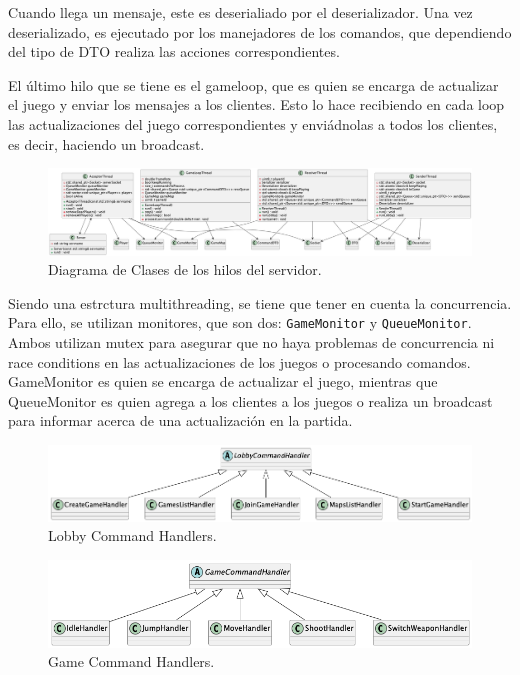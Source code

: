\documentclass[titlepage,a4paper]{article}
\begin{document}
Cuando llega un mensaje, este es deserialiado por el deserializador. Una vez deserializado, es ejecutado por los manejadores de los comandos, que dependiendo del tipo de DTO realiza las acciones correspondientes. 

El último hilo que se tiene es el gameloop, que es quien se encarga de actualizar el juego y enviar los mensajes a los clientes. Esto lo hace recibiendo en cada loop las actualizaciones del juego correspondientes y enviádnolas a todos los clientes, es decir, haciendo un broadcast.

\begin{figure}[H]
  \centering
  \includegraphics[width=\textwidth]{images/Server Threads Classes.png}
  \caption{Diagrama de Clases de los hilos del servidor.}
  \label{fig:server-threads}
\end{figure}

Siendo una estrctura multithreading, se tiene que tener en cuenta la concurrencia. Para ello, se utilizan monitores, que son dos: \texttt{GameMonitor} y \texttt{QueueMonitor}. Ambos utilizan mutex para asegurar que no haya problemas de concurrencia ni race conditions en las actualizaciones de los juegos o procesando comandos. GameMonitor es quien se encarga de actualizar el juego, mientras que QueueMonitor es quien agrega a los clientes a los juegos o realiza un broadcast para informar acerca de una actualización en la partida.

\begin{figure}[H]
  \centering
  \includegraphics[width=\textwidth]{images/Lobby Command Handlers.png}
  \caption{Lobby Command Handlers.}
  \label{fig:lobby-cmd-handler}
\end{figure}

\begin{figure}[H]
  \centering
  \includegraphics[width=\textwidth]{images/Game Command Handlers.png}
  \caption{Game Command Handlers.}
  \label{fig:game-cmd-hanlder}
\end{figure}
\end{document}
